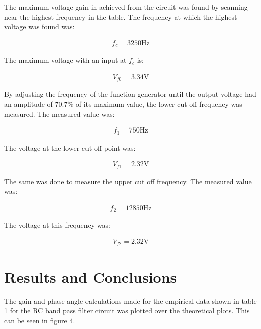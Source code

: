 \documentclass{article}
\begin{document}
The maximum voltage gain in achieved from the circuit was found by scanning near the highest frequency in the table. The frequency at which the highest voltage was found was:

\begin{align*}
	f_c = 3250\si{\hertz}
\end{align*} 

The maximum voltage with an input at $f_c$ is:

\begin{align*}
	V_{f0} = 3.34\si{\volt}
\end{align*}

By adjusting the frequency of the function generator until the output voltage had an amplitude of 70.7\% of its maximum value, the lower cut off frequency was measured. The measured value was:

\begin{align*}
	f_1 = 750 \si{\hertz}
\end{align*}

The voltage at the lower cut off point was:

\begin{align*}
	V_{f1} = 2.32\si{\volt}
\end{align*}

The same was done to measure the upper cut off frequency. The measured value was:

\begin{align*}
	f_2 = 12850\si{\hertz}
\end{align*}

The voltage at this frequency was:

\begin{align*}
	V_{f2} = 2.32\si{\volt}
\end{align*}

\newpage


\section{Results and Conclusions}

The gain and phase angle calculations made for the empirical data shown in table 1 for the RC band pass filter circuit was plotted over the theoretical plots. This can be seen in figure 4.
\end{document}
